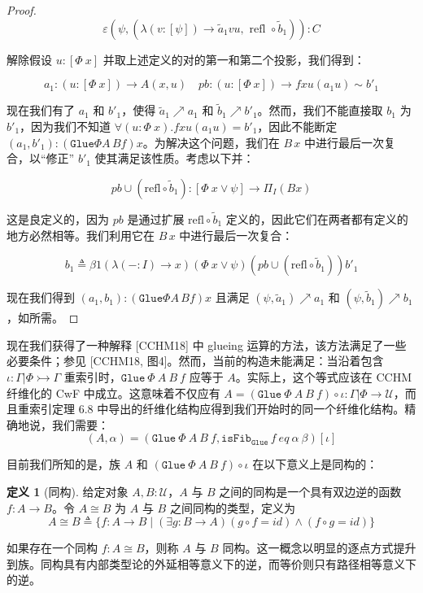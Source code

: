 \documentclass{ctexart}
\theoremstyle{plain}
\theoremstyle{definition}
\newtheorem{definition}[theorem]{定义}
\theoremstyle{definition}
\theoremstyle{definition}
\theoremstyle{definition}
\numberwithin{equation}{section}
\begin{document}
\begin{proof}
\[ \varepsilon (\psi, (\lambda(v : [\psi]) \to \tilde{a}_1 v u, \text{ refl } \circ \tilde{b}_1)) : C \]

解除假设 $ u : [\Phi\ x] $ 并取上述定义的对的第一和第二个投影，我们得到：

\[ a_1 : (u : [\Phi\ x]) \to A(x, u) \quad pb : (u : [\Phi\ x]) \to f x u (a_1 u) \sim b'_1 \]

现在我们有了 $ a_1 $ 和 $ b'_1 $，使得 $ \tilde{a}_1 \nearrow a_1 $ 和 $ \tilde{b}_1 \nearrow b'_1 $。然而，我们不能直接取 $ b_1 $ 为 $ b'_1 $，因为我们不知道 $ \forall (u : \Phi\ x) . f x u (a_1 u) = b'_1 $，因此不能断定 $ (a_1, b'_1) : (\mathtt{Glue} \Phi A\,B f) x $。为解决这个问题，我们在 $ B\,x $ 中进行最后一次复合，以“修正” $ b'_1 $ 使其满足该性质。考虑以下并：

\[ pb \cup (\text{refl} \circ \tilde{b}_1) : [\Phi\ x \lor \psi] \to \Pi_I(Bx) \]

这是良定义的，因为 $ pb $ 是通过扩展 $ \text{refl} \circ \tilde{b}_1 $ 定义的，因此它们在两者都有定义的地方必然相等。我们利用它在 $ B\,x $ 中进行最后一次复合：

\[ b_1 \triangleq \beta 1 (\lambda(- : I) \to x) (\Phi\ x \lor \psi) (pb \cup (\text{refl} \circ \tilde{b}_1)) b'_1 \]

现在我们得到 $ (a_1, b_1) : (\mathtt{Glue} \Phi A\,B f) x $ 且满足 $ (\psi, \tilde{a}_1) \nearrow a_1 $ 和 $ (\psi, \tilde{b}_1) \nearrow b_1 $，如所需。
\end{proof}
现在我们获得了一种解释 [CCHM18] 中 glueing 运算的方法，该方法满足了一些必要条件；参见 [CCHM18, 图4]。然而，当前的构造未能满足：当沿着包含 $ \iota : \Gamma |\Phi \rightarrowtail \Gamma $ 重索引时，$ \mathtt{Glue}\ \Phi\ A\ B\ f $ 应等于 $ A $。实际上，这个等式应该在 CCHM 纤维化的 CwF 中成立。这意味着不仅应有 $ A = (\mathtt{Glue}\ \Phi\ A\ B\ f) \circ \iota : \Gamma |\Phi \to \mathcal{U} $，而且重索引定理 6.8 中导出的纤维化结构应得到我们开始时的同一个纤维化结构。精确地说，我们需要：
\begin{equation} (A, \alpha) = (\mathtt{Glue}\ \Phi\ A\ B\ f, \mathtt{isFib}_{\mathtt{Glue}} \, f \ eq \ \alpha \ \beta)[\iota] \end{equation}

目前我们所知的是，族 $ A $ 和 $ (\mathtt{Glue}\ \Phi\ A\ B\ f) \circ \iota $ 在以下意义上是同构的：

\begin{definition}[同构]
  给定对象 $ A, B : \mathcal{U} $，$ A $ 与 $ B $ 之间的同构是一个具有双边逆的函数 $ f : A \to B $。令 $ A \cong B $ 为 $ A $ 与 $ B $ 之间同构的类型，定义为
\[ A \cong B \triangleq \{f : A \to B \mid (\exists g : B \to A) (g \circ f = id) \land (f \circ g = id)\} \]
\end{definition}
如果存在一个同构 $ f : A \cong B $，则称 $ A $ 与 $ B $ 同构。这一概念以明显的逐点方式提升到族。同构具有内部类型论的外延相等意义下的逆，而等价则只有路径相等意义下的逆。
\end{document}
